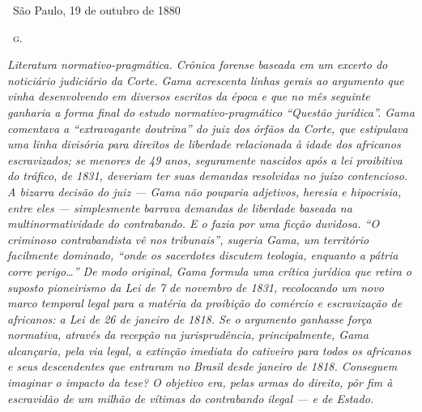 {\medskip

\hfill\ São Paulo, 19 de outubro de 1880

\hfill\ \textsc{g.}


\begin{resumo}
\emph{Literatura normativo-pragmática. Crônica forense baseada em um
excerto do noticiário judiciário da Corte. Gama acrescenta linhas gerais
ao argumento que vinha desenvolvendo em diversos escritos da época e que
no mês seguinte ganharia a forma final do estudo normativo-pragmático ``Questão jurídica''. Gama comentava a ``extravagante doutrina'' do
juiz dos órfãos da Corte, que estipulava uma linha divisória para
direitos de liberdade relacionada à idade dos africanos escravizados; se
menores de 49 anos, seguramente nascidos após a lei proibitiva do
tráfico, de 1831, deveriam ter suas demandas resolvidas no juízo
contencioso. A bizarra decisão do juiz --- Gama não pouparia adjetivos,
heresia e hipocrisia, entre eles --- simplesmente barrava demandas de
liberdade baseada na multinormatividade do contrabando. E o fazia por
uma ficção duvidosa. ``O criminoso contrabandista vê nos tribunais'',
sugeria Gama, um território facilmente dominado, ``onde os sacerdotes
discutem teologia, enquanto a pátria corre perigo\ldots{}'' De modo original,
Gama formula uma crítica jurídica que retira o suposto pioneirismo da
Lei de 7 de novembro de 1831, recolocando um novo marco temporal legal
para a matéria da proibição do comércio e escravização de africanos: a
Lei de 26 de janeiro de 1818. Se o argumento ganhasse força normativa,
através da recepção na jurisprudência, principalmente, Gama alcançaria,
pela via legal, a extinção imediata do cativeiro para todos os africanos
e seus descendentes que entraram no Brasil desde janeiro de 1818.
Conseguem imaginar o impacto da tese? O objetivo era, pelas armas do
direito, pôr fim à escravidão de um milhão de vítimas do contrabando
ilegal --- e de Estado. }
\end{resumo}

}
